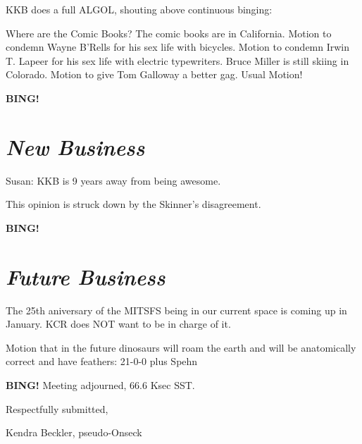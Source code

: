 \documentclass[10pt]{article}
\newcommand{\bing}{{\bf BING!} }
\newcommand{\goto}[1]{\bing \vskip 12pt \section*{{\em{#1}}}}
\newcommand{\ps}{ plus Spehn\xspace}
\begin{document}
KKB does a full ALGOL, shouting above continuous binging: 

Where are the Comic Books?  The comic books are in California.  Motion to condemn Wayne B'Rells for his sex life with bicycles.  Motion to condemn Irwin T. Lapeer for his sex life with electric typewriters.  Bruce Miller is still skiing in Colorado.  Motion to give Tom Galloway a better gag.  Usual Motion!

\goto{New Business}

Susan: KKB is 9 years away from being awesome.

This opinion is struck down by the Skinner's disagreement.

\goto{Future Business}

The 25th aniversary of the MITSFS being in our current space is coming up in January.  KCR does NOT want to be in charge of it.

Motion that in the future dinosaurs will roam the earth and will be anatomically correct and have feathers: 21-0-0 \ps

\bing
\noindent
Meeting adjourned, 66.6 Ksec SST.

\vspace{18pt}

\centerline{Respectfully submitted,}
\centerline{Kendra Beckler, pseudo-Onseck}
\end{document}
